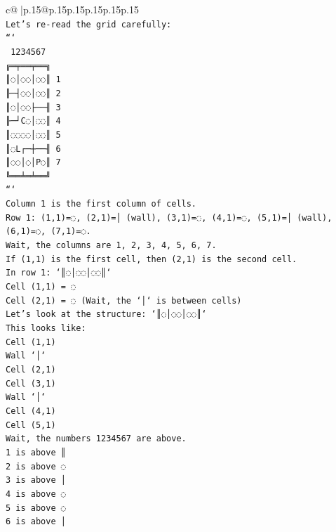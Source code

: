 \documentclass{article}
\begin{document}
{\begin{supertabular}{c@{$\;$}|p{.15\linewidth}@{}p{.15\linewidth}p{.15\linewidth}p{.15\linewidth}p{.15\linewidth}p{.15\linewidth}}
{{{\\ 
\texttt{Let's re{-}read the grid carefully:} \\
\texttt{```} \\
\texttt{ 1234567} \\
\texttt{╔═╤══╤══╗} \\
\texttt{║◌│◌◌│◌◌║ 1} \\
\texttt{╟─┤◌◌│◌◌║ 2} \\
\texttt{║◌│◌◌├──╢ 3} \\
\texttt{╟─┘C◌│◌◌║ 4} \\
\texttt{║◌◌◌◌│◌◌║ 5} \\
\texttt{║◌L┌─┼──╢ 6} \\
\texttt{║◌◌│◌│P◌║ 7} \\
\texttt{╚══╧═╧══╝} \\
\texttt{```} \\
\texttt{Column 1 is the first column of cells.} \\
\texttt{Row 1: (1,1)=◌, (2,1)=│ (wall), (3,1)=◌, (4,1)=◌, (5,1)=│ (wall), (6,1)=◌, (7,1)=◌.} \\
\texttt{Wait, the columns are 1, 2, 3, 4, 5, 6, 7.} \\
\texttt{If (1,1) is the first cell, then (2,1) is the second cell.} \\
\texttt{In row 1: `║◌│◌◌│◌◌║`} \\
\texttt{Cell (1,1) = ◌} \\
\texttt{Cell (2,1) = ◌ (Wait, the `│` is between cells)} \\
\texttt{Let's look at the structure: `║◌│◌◌│◌◌║`} \\
\texttt{This looks like:} \\
\texttt{Cell (1,1)} \\
\texttt{Wall `│`} \\
\texttt{Cell (2,1)} \\
\texttt{Cell (3,1)} \\
\texttt{Wall `│`} \\
\texttt{Cell (4,1)} \\
\texttt{Cell (5,1)} \\
\texttt{Wait, the numbers 1234567 are above.} \\
\texttt{1 is above ║} \\
\texttt{2 is above ◌} \\
\texttt{3 is above │} \\
\texttt{4 is above ◌} \\
\texttt{5 is above ◌} \\
\texttt{6 is above │} \\
}}}
\end{supertabular}}
\end{document}
